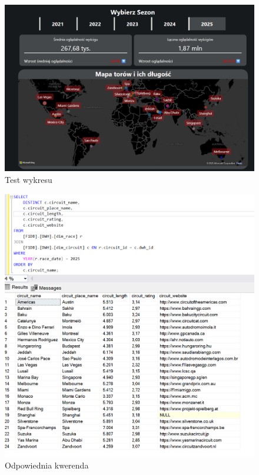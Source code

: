 \documentclass[12pt]{article}
\begin{document}
\begin{figure}[H]
    \centering   \includegraphics[width=\textwidth]{t8.png}
    \caption{Test wykresu}
\end{figure}

\begin{figure}[H]
    \centering   \includegraphics[width=\textwidth]{t9.png}
    \caption{Odpowiednia kwerenda}
\end{figure}
\end{document}
